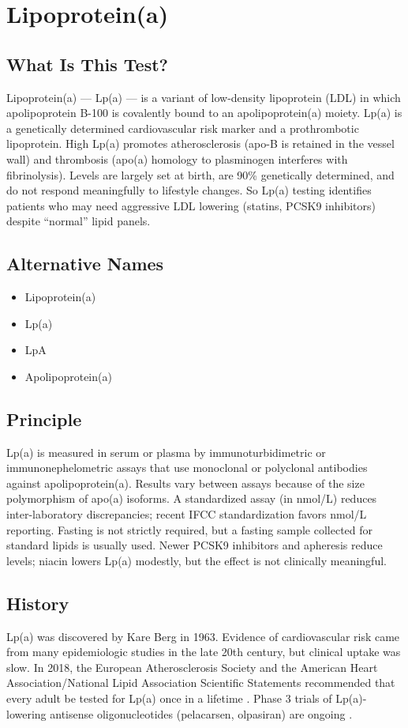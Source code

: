 \chapter{Lipoprotein(a)}

\section*{What Is This Test?}
Lipoprotein(a) --- Lp(a) --- is a variant of low-density lipoprotein (LDL) in which apolipoprotein B-100 is covalently bound to an apolipoprotein(a) moiety. Lp(a) is a genetically determined cardiovascular risk marker and a prothrombotic lipoprotein. High Lp(a) promotes atherosclerosis (apo-B is retained in the vessel wall) and thrombosis (apo(a) homology to plasminogen interferes with fibrinolysis). Levels are largely set at birth, are 90\% genetically determined, and do not respond meaningfully to lifestyle changes. So Lp(a) testing identifies patients who may need aggressive LDL lowering (statins, PCSK9 inhibitors) despite ``normal'' lipid panels.

\section*{Alternative Names}
\begin{itemize}
  \item Lipoprotein(a)
  \item Lp(a)
  \item LpA
  \item Apolipoprotein(a)
\end{itemize}
\section*{Principle}
Lp(a) is measured in serum or plasma by immunoturbidimetric or immunonephelometric assays that use monoclonal or polyclonal antibodies against apolipoprotein(a). Results vary between assays because of the size polymorphism of apo(a) isoforms. A standardized assay (in nmol/L) reduces inter-laboratory discrepancies; recent IFCC standardization favors nmol/L reporting. Fasting is not strictly required, but a fasting sample collected for standard lipids is usually used. Newer PCSK9 inhibitors and apheresis reduce levels; niacin lowers Lp(a) modestly, but the effect is not clinically meaningful.

\section*{History}
Lp(a) was discovered by Kare Berg in 1963. Evidence of cardiovascular risk came from many epidemiologic studies in the late 20th century, but clinical uptake was slow. In 2018, the European Atherosclerosis Society and the American Heart Association/National Lipid Association Scientific Statements recommended that every adult be tested for Lp(a) once in a lifetime \cite{kronenberg2022lipoprotein,wilson2019use}. Phase 3 trials of Lp(a)-lowering antisense oligonucleotides (pelacarsen, olpasiran) are ongoing \cite{viney2016antisense}.

